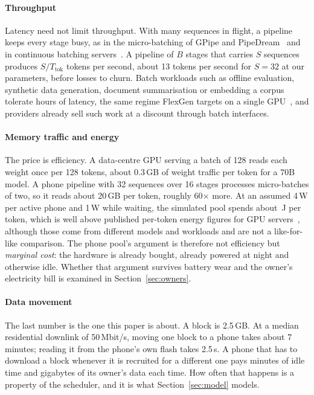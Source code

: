 \documentclass[preprint,review,12pt,authoryear]{elsarticle}
\begin{document}
\paragraph{Throughput} Latency need not limit throughput. With many sequences
in flight, a pipeline keeps every stage busy, as in the micro-batching of
GPipe and PipeDream~\citep{gpipe,pipedream} and in continuous batching
servers~\citep{orca,vllm,sarathi}. A pipeline of $B$ stages that carries $S$
sequences produces $S/T_{\text{tok}}$ tokens per second, about 13 tokens per
second for $S=32$ at our parameters, before losses to churn. Batch workloads such as offline
evaluation, synthetic data generation, document summarisation or embedding a
corpus tolerate hours of latency, the same regime FlexGen targets on a single
GPU~\citep{flexgen}, and providers already sell such work at a discount through
batch interfaces.

\paragraph{Memory traffic and energy} The price is efficiency. A data-centre
GPU serving a batch of 128 reads each weight once per 128 tokens, about
0.3\,GB of weight traffic per token for a 70B model. A phone pipeline with 32
sequences over 16 stages processes micro-batches of two, so it reads about
20\,GB per token, roughly 60$\times$ more. At an assumed 4\,W per active phone
and 1\,W while waiting, the simulated pool spends about \JNS\,J per token,
which is well above published per-token energy figures for GPU
servers~\citep{samsi2023}, although those come from different models and
workloads and are not a like-for-like comparison. The phone pool's argument is
therefore not efficiency but \emph{marginal cost}: the hardware is already
bought, already powered at night and otherwise idle. Whether that argument
survives battery wear and the owner's electricity bill is examined in
Section~\ref{sec:owners}.

\paragraph{Data movement} The last number is the one this paper is about. A
block is 2.5\,GB. At a median residential downlink of 50\,Mbit/s, moving one
block to a phone takes about 7 minutes; reading it from the phone's own flash
takes 2.5\,s. A phone that has to download a block whenever it is recruited
for a different one pays minutes of idle time and gigabytes of its owner's data
each time. How often that happens is a property of the scheduler, and it is
what Section~\ref{sec:model} models.
\end{document}
